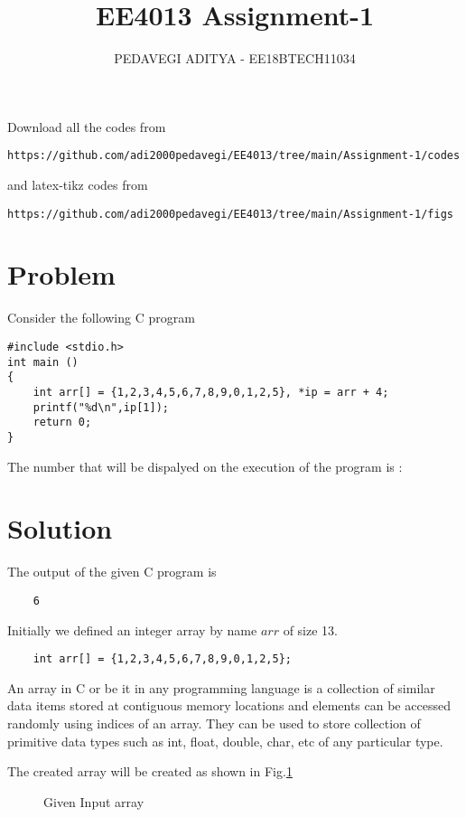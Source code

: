 \documentclass[journal,12pt,twocolumn]{IEEEtran}
\begin{document}
\def\rightbox#1{\makebox[0in][r]{#1}}
\def\centbox#1{\makebox[0in]{#1}}
\def\topbox#1{\raisebox{-\baselineskip}[0in][0in]{#1}}
\def\midbox#1{\raisebox{-0.5\baselineskip}[0in][0in]{#1}}
\vspace{3cm}
\title{EE4013 Assignment-1}
\author{PEDAVEGI ADITYA - EE18BTECH11034}
\maketitle
\newpage
\bigskip
\renewcommand{\thefigure}{\theenumi}
\renewcommand{\thetable}{\theenumi}
Download all the codes from
\begin{lstlisting}
https://github.com/adi2000pedavegi/EE4013/tree/main/Assignment-1/codes
\end{lstlisting}
%
and latex-tikz codes from
%
\begin{lstlisting}
https://github.com/adi2000pedavegi/EE4013/tree/main/Assignment-1/figs
\end{lstlisting}
\section{Problem}
Consider the following C program
\begin{lstlisting}
#include <stdio.h>
int main ()
{
	int arr[] = {1,2,3,4,5,6,7,8,9,0,1,2,5}, *ip = arr + 4;
	printf("%d\n",ip[1]);
	return 0;
}

\end{lstlisting}
The number that will be dispalyed on the execution of the program is :
\section{Solution}
The output of the given C program is
\begin{lstlisting}
    6
\end{lstlisting}

Initially we defined an integer array by name $arr$ of size 13.
\begin{lstlisting}
    int arr[] = {1,2,3,4,5,6,7,8,9,0,1,2,5};
\end{lstlisting}


An array in C or be it in any programming language is a collection of
similar data items stored at contiguous memory locations and elements can be
accessed randomly using indices of an array. They can be used to store
collection of primitive data types such as int, float, double, char, etc of any
particular type.

The created array will be created as shown in Fig.\ref{fig:ee18btech11034_1}
\begin{figure}[!ht]
    \begin{center}
        \resizebox{\columnwidth}{!}{}
    \end{center}
    \caption{Given Input array}
    \label{fig:ee18btech11034_1}
\end{figure}
\end{document}
